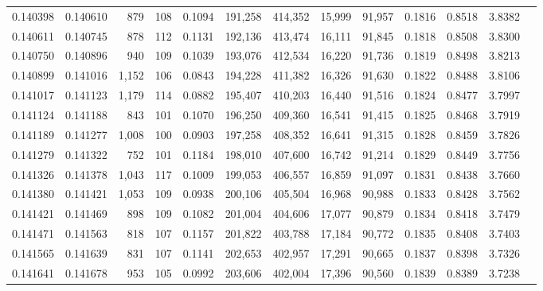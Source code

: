\begin{tabular}{rrrrrrrrrrrrr}
0.140398 & 0.140610 &   879 & 108 &                                     0.1094 & 191,258 & 414,352 &  15,999 &  91,957 & 0.1816 & 0.8518 & 3.8382 \\
0.140611 & 0.140745 &   878 & 112 &                                     0.1131 & 192,136 & 413,474 &  16,111 &  91,845 & 0.1818 & 0.8508 & 3.8300 \\
0.140750 & 0.140896 &   940 & 109 &                                     0.1039 & 193,076 & 412,534 &  16,220 &  91,736 & 0.1819 & 0.8498 & 3.8213 \\
0.140899 & 0.141016 & 1,152 & 106 &                                     0.0843 & 194,228 & 411,382 &  16,326 &  91,630 & 0.1822 & 0.8488 & 3.8106 \\
0.141017 & 0.141123 & 1,179 & 114 &                                     0.0882 & 195,407 & 410,203 &  16,440 &  91,516 & 0.1824 & 0.8477 & 3.7997 \\
0.141124 & 0.141188 &   843 & 101 &                                     0.1070 & 196,250 & 409,360 &  16,541 &  91,415 & 0.1825 & 0.8468 & 3.7919 \\
0.141189 & 0.141277 & 1,008 & 100 &                                     0.0903 & 197,258 & 408,352 &  16,641 &  91,315 & 0.1828 & 0.8459 & 3.7826 \\
0.141279 & 0.141322 &   752 & 101 &                                     0.1184 & 198,010 & 407,600 &  16,742 &  91,214 & 0.1829 & 0.8449 & 3.7756 \\
0.141326 & 0.141378 & 1,043 & 117 &                                     0.1009 & 199,053 & 406,557 &  16,859 &  91,097 & 0.1831 & 0.8438 & 3.7660 \\
0.141380 & 0.141421 & 1,053 & 109 &                                     0.0938 & 200,106 & 405,504 &  16,968 &  90,988 & 0.1833 & 0.8428 & 3.7562 \\
0.141421 & 0.141469 &   898 & 109 &                                     0.1082 & 201,004 & 404,606 &  17,077 &  90,879 & 0.1834 & 0.8418 & 3.7479 \\
0.141471 & 0.141563 &   818 & 107 &                                     0.1157 & 201,822 & 403,788 &  17,184 &  90,772 & 0.1835 & 0.8408 & 3.7403 \\
0.141565 & 0.141639 &   831 & 107 &                                     0.1141 & 202,653 & 402,957 &  17,291 &  90,665 & 0.1837 & 0.8398 & 3.7326 \\
0.141641 & 0.141678 &   953 & 105 &                                     0.0992 & 203,606 & 402,004 &  17,396 &  90,560 & 0.1839 & 0.8389 & 3.7238 \\

\end{tabular}
